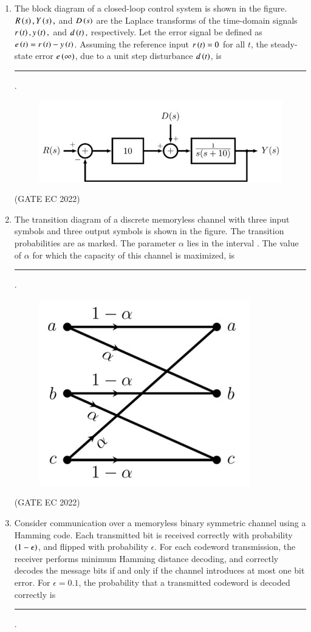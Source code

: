 \documentclass[journal,12pt,onecolumn]{IEEEtran}
\theoremstyle{remark}
\begin{document}
\begin{enumerate}
    \item The block diagram of a closed-loop control system is shown  in the figure. $R\left(s\right), Y\left(s\right),$ and $D\left(s\right)$ are the Laplace transforms of the time-domain signals $r\left(t\right), y\left(t\right),$ and $d\left(t\right),$ respectively. Let the error signal be defined as $e\left(t\right) = r\left(t\right) - y\left(t\right)$. Assuming the reference input $r\left(t\right) = 0$ for all $t$, the steady-state error $e\left(\infty\right)$, due to a unit step disturbance $d\left(t\right)$, is \rule{2cm}{0.4pt} .
    \begin{figure}[H]
        \centering
        \includegraphics[width=0.3\columnwidth]{figs/m31.jpg}
        \caption*{}
        \label{fig:m31}
    \end{figure}
    
    \hfill{(GATE EC 2022)}

    \item The transition diagram of a discrete memoryless channel with three input symbols and three output symbols is shown in the figure.  The transition probabilities are as marked.
    The parameter $\alpha$ lies in the interval . The value of $\alpha$ for which the capacity of this channel is maximized, is \rule{2cm}{0.4pt} .
    \begin{figure}[H]
        \centering
        \includegraphics[width=0.3\columnwidth]{figs/m32.jpg}
        \caption*{}
        \label{fig:m32}
    \end{figure}
    
    \hfill{(GATE EC 2022)}

    \item Consider communication over a memoryless binary symmetric channel using a  Hamming code. Each transmitted bit is received correctly with probability $\left(1-\epsilon\right)$, and flipped with probability $\epsilon$. For each codeword transmission, the receiver performs minimum Hamming distance decoding, and correctly decodes the message bits if and only if the channel introduces at most one bit error.
    For $\epsilon = 0.1$, the probability that a transmitted codeword is decoded correctly is \rule{2cm}{0.4pt} .
    

\end{enumerate}
\end{document}
